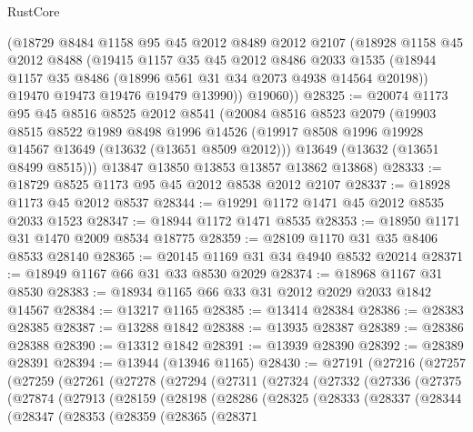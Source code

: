 \begin{lexlean}{RustCore}
\begin{coremodule}
      (@18729
        @8484
        @1158
        @95
        @45
        @2012
        @8489
        @2012
        @2107
        (@18928
          @1158
          @45
          @2012
          @8488
          (@19415
            @1157
            @35
            @45
            @2012
            @8486
            @2033
            @1535
            (@18944 @1157 @35 @8486 (@18996 @561 @31 @34 @2073 @4938 @14564 @20198))
            @19470
            @19473
            @19476
            @19479
            @13990))
        @19060))
@28325 := @20074
    @1173
    @95
    @45
    @8516
    @8525
    @2012
    @8541
    (@20084
      @8516
      @8523
      @2079
      (@19903
        @8515
        @8522
        @1989
        @8498
        @1996
        @14526
        (@19917 @8508 @1996 @19928 @14567 @13649 (@13632 (@13651 @8509 @2012)))
        @13649
        (@13632 (@13651 @8499 @8515)))
      @13847
      @13850
      @13853
      @13857
      @13862
      @13868)
@28333 := @18729 @8525 @1173 @95 @45 @2012 @8538 @2012 @2107
@28337 := @18928 @1173 @45 @2012 @8537
@28344 := @19291 @1172 @1471 @45 @2012 @8535 @2033 @1523
@28347 := @18944 @1172 @1471 @8535
@28353 := @18950 @1171 @31 @1470 @2009 @8534 @18775
@28359 := @28109 @1170 @31 @35 @8406 @8533 @28140
@28365 := @20145 @1169 @31 @34 @4940 @8532 @20214
@28371 := @18949 @1167 @66 @31 @33 @8530 @2029
@28374 := @18968 @1167 @31 @8530
@28383 := @18934 @1165 @66 @33 @31 @2012 @2029 @2033 @1842 @14567
@28384 := @13217 @1165
@28385 := @13414 @28384
@28386 := @28383 @28385
@28387 := @13288 @1842
@28388 := @13935 @28387
@28389 := @28386 @28388
@28390 := @13312 @1842
@28391 := @13939 @28390
@28392 := @28389 @28391
@28394 := @13944 (@13946 @1165)
@28430 := @27191
    (@27216
      (@27257
        (@27259
          (@27261
            (@27278
              (@27294
                (@27311
                  (@27324
                    (@27332
                      (@27336
                        (@27375
                          (@27874
                            (@27913
                              (@28159
                                (@28198
                                  (@28286
                                    (@28325
                                      (@28333
                                        (@28337
                                          (@28344
                                            (@28347
                                              (@28353
                                                (@28359
                                                  (@28365
                                                    (@28371

\end{coremodule}
\end{lexlean}
